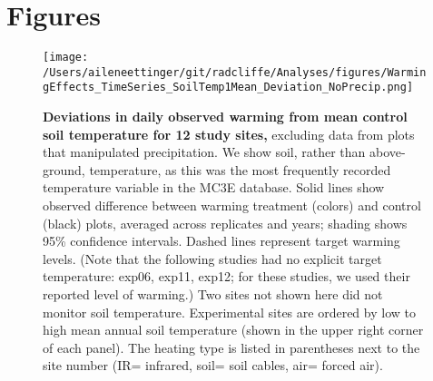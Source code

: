 \documentclass{article}
\begin{document}


\clearpage
\section* {Figures}
\clearpage
 \begin{figure}[h]
\centering
 \texttt{[image: /Users/aileneettinger/git/radcliffe/Analyses/figures/WarmingEffects\_TimeSeries\_SoilTemp1Mean\_Deviation\_NoPrecip.png]}
 \caption{\textbf{Deviations in daily observed warming from mean control soil temperature for 12 study sites,} excluding data from plots that manipulated precipitation. We show soil, rather than above-ground, temperature, as this was the most frequently recorded temperature variable in the MC3E database. Solid lines show observed difference between warming treatment (colors) and control (black) plots, averaged across replicates and years; shading shows 95\% confidence intervals. Dashed lines represent target warming levels. (Note that the following studies had no explicit target temperature: exp06, exp11, exp12; for these studies, we used their reported level of warming.) Two sites not shown here did not monitor soil temperature. Experimental sites are ordered by low to high mean annual soil temperature (shown in the upper right corner of each panel). The heating type is listed in parentheses next to the site number (IR= infrared, soil= soil cables, air= forced air).} %
 \label{fig:effwarm}
 \end{figure}

\end{document}
